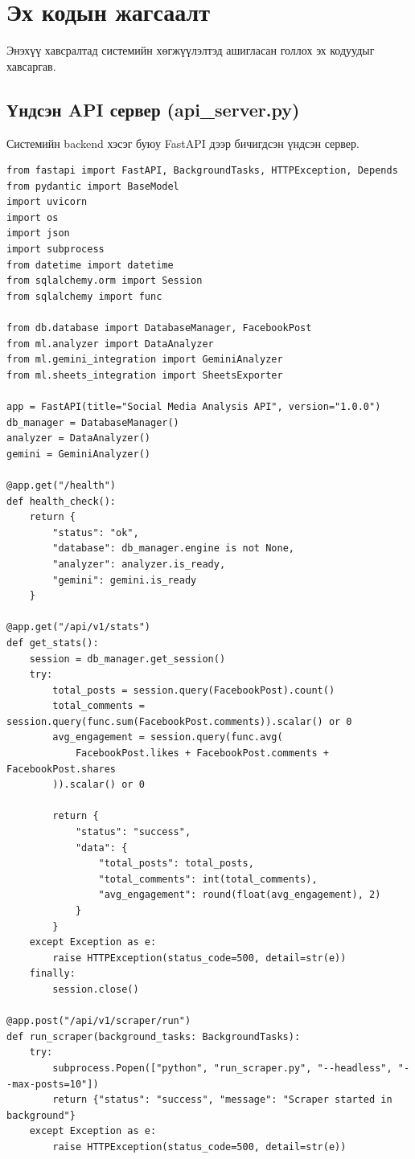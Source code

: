 \chapter{Эх кодын жагсаалт}

Энэхүү хавсралтад системийн хөгжүүлэлтэд ашигласан голлох эх кодуудыг хавсаргав. 

\section{Үндсэн API сервер (api\_server.py)}
Системийн backend хэсэг буюу FastAPI дээр бичигдсэн үндсэн сервер.
\begin{verbatim}
from fastapi import FastAPI, BackgroundTasks, HTTPException, Depends
from pydantic import BaseModel
import uvicorn
import os
import json
import subprocess
from datetime import datetime
from sqlalchemy.orm import Session
from sqlalchemy import func

from db.database import DatabaseManager, FacebookPost
from ml.analyzer import DataAnalyzer
from ml.gemini_integration import GeminiAnalyzer
from ml.sheets_integration import SheetsExporter

app = FastAPI(title="Social Media Analysis API", version="1.0.0")
db_manager = DatabaseManager()
analyzer = DataAnalyzer()
gemini = GeminiAnalyzer()

@app.get("/health")
def health_check():
    return {
        "status": "ok",
        "database": db_manager.engine is not None,
        "analyzer": analyzer.is_ready,
        "gemini": gemini.is_ready
    }

@app.get("/api/v1/stats")
def get_stats():
    session = db_manager.get_session()
    try:
        total_posts = session.query(FacebookPost).count()
        total_comments = session.query(func.sum(FacebookPost.comments)).scalar() or 0
        avg_engagement = session.query(func.avg(
            FacebookPost.likes + FacebookPost.comments + FacebookPost.shares
        )).scalar() or 0
        
        return {
            "status": "success",
            "data": {
                "total_posts": total_posts,
                "total_comments": int(total_comments),
                "avg_engagement": round(float(avg_engagement), 2)
            }
        }
    except Exception as e:
        raise HTTPException(status_code=500, detail=str(e))
    finally:
        session.close()

@app.post("/api/v1/scraper/run")
def run_scraper(background_tasks: BackgroundTasks):
    try:
        subprocess.Popen(["python", "run_scraper.py", "--headless", "--max-posts=10"])
        return {"status": "success", "message": "Scraper started in background"}
    except Exception as e:
        raise HTTPException(status_code=500, detail=str(e))
\end{verbatim}

